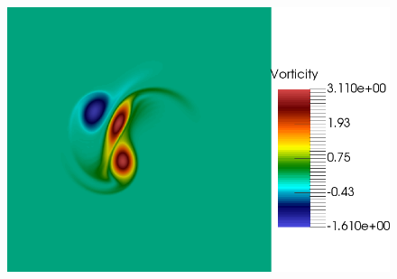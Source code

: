 \begin{figure}[t]
\includegraphics[scale=0.06]{data/Incompressible_Euler/Snapshots/Full_3.png}\\


\end{figure}
